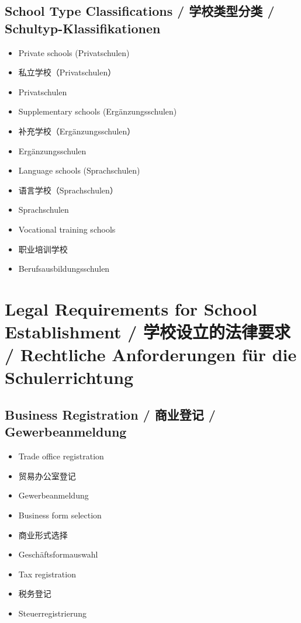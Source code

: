 \subsection{School Type Classifications / 学校类型分类 / Schultyp-Klassifikationen}
\begin{itemize}
    \item Private schools (Privatschulen)
    \item 私立学校（Privatschulen）
    \item Privatschulen
    \item Supplementary schools (Ergänzungsschulen)
    \item 补充学校（Ergänzungsschulen）
    \item Ergänzungsschulen
    \item Language schools (Sprachschulen)
    \item 语言学校（Sprachschulen）
    \item Sprachschulen
    \item Vocational training schools
    \item 职业培训学校
    \item Berufsausbildungsschulen
\end{itemize}

\section{Legal Requirements for School Establishment / 学校设立的法律要求 / Rechtliche Anforderungen für die Schulerrichtung}

\subsection{Business Registration / 商业登记 / Gewerbeanmeldung}
\begin{itemize}
    \item Trade office registration
    \item 贸易办公室登记
    \item Gewerbeanmeldung
    \item Business form selection
    \item 商业形式选择
    \item Geschäftsformauswahl
    \item Tax registration
    \item 税务登记
    \item Steuerregistrierung
\end{itemize}

